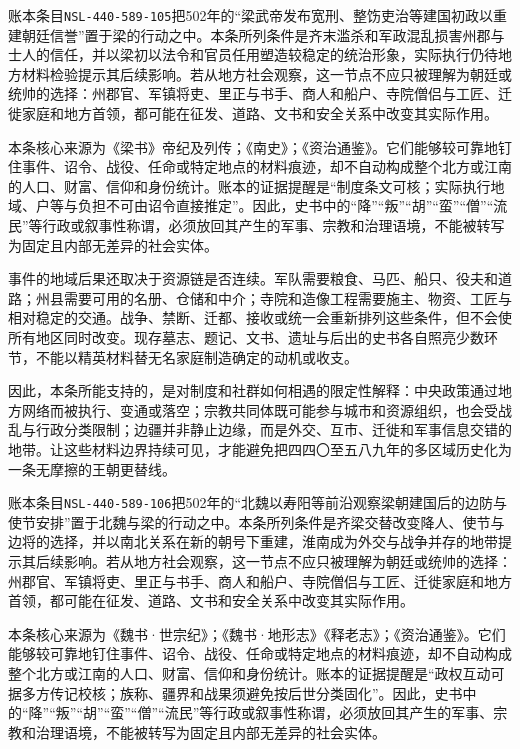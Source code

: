 账本条目\texttt{NSL-440-589-105}把502年的“梁武帝发布宽刑、整饬吏治等建国初政以重建朝廷信誉”置于梁的行动之中。本条所列条件是齐末滥杀和军政混乱损害州郡与士人的信任，并以梁初以法令和官员任用塑造较稳定的统治形象，实际执行仍待地方材料检验提示其后续影响。若从地方社会观察，这一节点不应只被理解为朝廷或统帅的选择：州郡官、军镇将吏、里正与书手、商人和船户、寺院僧侣与工匠、迁徙家庭和地方首领，都可能在征发、道路、文书和安全关系中改变其实际作用。

本条核心来源为《梁书》帝纪及列传；《南史》；《资治通鉴》。它们能够较可靠地钉住事件、诏令、战役、任命或特定地点的材料痕迹，却不自动构成整个北方或江南的人口、财富、信仰和身份统计。账本的证据提醒是“制度条文可核；实际执行地域、户等与负担不可由诏令直接推定”。因此，史书中的“降”“叛”“胡”“蛮”“僧”“流民”等行政或叙事性称谓，必须放回其产生的军事、宗教和治理语境，不能被转写为固定且内部无差异的社会实体。

事件的地域后果还取决于资源链是否连续。军队需要粮食、马匹、船只、役夫和道路；州县需要可用的名册、仓储和中介；寺院和造像工程需要施主、物资、工匠与相对稳定的交通。战争、禁断、迁都、接收或统一会重新排列这些条件，但不会使所有地区同时改变。现存墓志、题记、文书、遗址与后出的史书各自照亮少数环节，不能以精英材料替无名家庭制造确定的动机或收支。

因此，本条所能支持的，是对制度和社群如何相遇的限定性解释：中央政策通过地方网络而被执行、变通或落空；宗教共同体既可能参与城市和资源组织，也会受战乱与行政分类限制；边疆并非静止边缘，而是外交、互市、迁徙和军事信息交错的地带。让这些材料边界持续可见，才能避免把四四〇至五八九年的多区域历史化为一条无摩擦的王朝更替线。

账本条目\texttt{NSL-440-589-106}把502年的“北魏以寿阳等前沿观察梁朝建国后的边防与使节安排”置于北魏与梁的行动之中。本条所列条件是齐梁交替改变降人、使节与边将的选择，并以南北关系在新的朝号下重建，淮南成为外交与战争并存的地带提示其后续影响。若从地方社会观察，这一节点不应只被理解为朝廷或统帅的选择：州郡官、军镇将吏、里正与书手、商人和船户、寺院僧侣与工匠、迁徙家庭和地方首领，都可能在征发、道路、文书和安全关系中改变其实际作用。

本条核心来源为《魏书·世宗纪》；《魏书·地形志》《释老志》；《资治通鉴》。它们能够较可靠地钉住事件、诏令、战役、任命或特定地点的材料痕迹，却不自动构成整个北方或江南的人口、财富、信仰和身份统计。账本的证据提醒是“政权互动可据多方传记校核；族称、疆界和战果须避免按后世分类固化”。因此，史书中的“降”“叛”“胡”“蛮”“僧”“流民”等行政或叙事性称谓，必须放回其产生的军事、宗教和治理语境，不能被转写为固定且内部无差异的社会实体。

